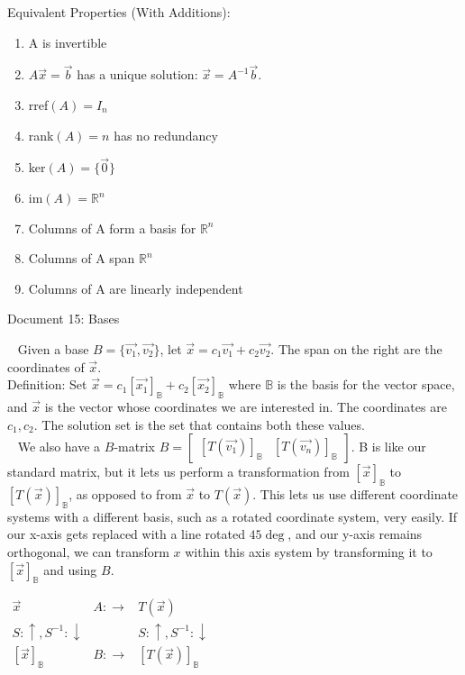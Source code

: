 \documentclass[12pt]{article}
\begin{document}
\newpage
Equivalent Properties (With Additions):
\begin{enumerate}
\item A is invertible
\item $A\vec{x}=\vec{b}$ has a unique solution: $\vec{x}=A^{-1}\vec{b}$.
\item rref$(A)=I_n$
\item rank$(A)=n$ has no redundancy
\item ker$(A)=\{\vec{0}\}$
\item im$(A)=\mathbb{R}^n$
\item Columns of A form a basis for $\mathbb{R}^n$
\item Columns of A span $\mathbb{R}^n$
\item Columns of A are linearly independent
\end{enumerate}

\newpage
\begin{center}
Document 15: Bases
\end{center}

\setlength{\leftskip}{0 in}
$\,\,\,$ Given a base $B=\lbrace \vec{v_1},\vec{v_2}\rbrace$, let $\vec{x}=c_1\vec{v_1}+c_2\vec{v_2}$. The span on the right are the coordinates of $\vec{x}$.\\

Definition: Set $\vec{x}=c_1[\vec{x_1}]_\mathbb{B}+c_2[\vec{x_2}]_\mathbb{B}$ where $\mathbb{B}$ is the basis for the vector space, and $\vec{x}$ is the vector whose coordinates we are interested in. The coordinates are $c_1,c_2$. The solution set is the set that contains both these values.\\

$\,\,\,$ We also have a $B$-matrix $B=\begin{bmatrix}[T(\vec{v_1})]_\mathbb{B} & [T(\vec{v_n})]_\mathbb{B}\end{bmatrix}$. B is like our standard matrix, but it lets us perform a transformation from $[\vec{x}]_\mathbb{B}$ to $[T(\vec{x})]_\mathbb{B}$, as opposed to from $\vec{x}$ to $T(\vec{x})$. This lets us use different coordinate systems with a different basis, such as a rotated coordinate system, very easily. If our x-axis gets replaced with a line rotated $45\deg$, and our y-axis remains orthogonal, we can transform $x$ within this axis system by transforming it to $[\vec{x}]_\mathbb{B}$ and using $B$.

\begin{center}
$\begin{matrix}
\vec{x} & A:\rightarrow & T(\vec{x})\\
S: \uparrow, S^{-1}: \downarrow & & S: \uparrow, S^{-1}: \downarrow\\
[\vec{x}]_\mathbb{B} & B: \rightarrow & [T(\vec{x})]_\mathbb{B}
\end{matrix}$\\
\end{center}
\end{document}
